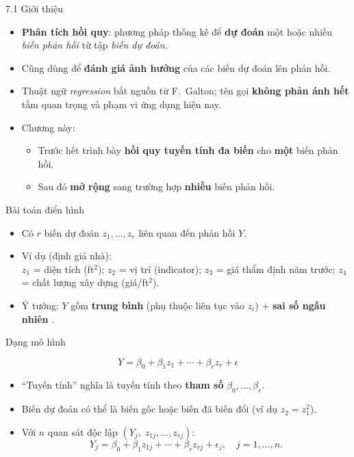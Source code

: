 \begin{frame}{7.1 Giới thiệu}
\begin{itemize}
  \item \textbf{Phân tích hồi quy}: phương pháp thống kê để \textbf{dự đoán} một hoặc nhiều \emph{biến phản hồi} từ tập \emph{biến dự đoán}.
  \item Cũng dùng để \textbf{đánh giá ảnh hưởng} của các biến dự đoán lên phản hồi.
  \item Thuật ngữ \emph{regression} bắt nguồn từ F.~Galton; tên gọi \textbf{không phản ánh hết} tầm quan trọng và phạm vi ứng dụng hiện nay.
  \item Chương này: 
  \begin{itemize}
    \item Trước hết trình bày \textbf{hồi quy tuyến tính đa biến} cho \textbf{một} biến phản hồi.
    \item Sau đó \textbf{mở rộng} sang trường hợp \textbf{nhiều} biến phản hồi.
  \end{itemize}
  
\end{itemize}
\end{frame}

\begin{frame}{Bài toán điển hình}
\begin{itemize}
  \item Có $r$ biến dự đoán $z_1,\ldots,z_r$ liên quan đến phản hồi $Y$.
  \item Ví dụ (định giá nhà): \\
  $z_1$ = diện tích (ft$^2$); \;
  $z_2$ = vị trí (indicator); \;
  $z_3$ = giá thẩm định năm trước; \;
  $z_4$ = chất lượng xây dựng (giá/ft$^2$).
  \item Ý tưởng: $Y$ gồm \textbf{trung bình} (phụ thuộc liên tục vào $z_i$) + \textbf{sai số ngẫu nhiên} {\epsilon}.
\end{itemize}
\end{frame}

\begin{frame}{Dạng mô hình}

\[
Y=\beta_0+\beta_1 z_1+\cdots+\beta_r z_r+\epsilon
\]
\begin{itemize}
  \item ``Tuyến tính'' nghĩa là tuyến tính theo \textbf{tham số} $\beta_0,\ldots,\beta_r$. 
  \item Biến dự đoán có thể là biến gốc hoặc biến đã biến đổi (ví dụ $z_2=z_1^2$).
  \item Với $n$ quan sát độc lập $(Y_j,\; z_{1j},\ldots,z_{rj})$:
  \[
  Y_j=\beta_0+\beta_1 z_{1j}+ \cdots + \beta_r z_{rj}+\epsilon_j,\quad j=1,\ldots,n.
  \]
\end{itemize}
\end{frame}

